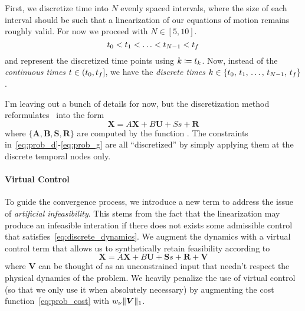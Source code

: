 \documentclass[10pt]{article}
\begin{document}

First, we discretize time into $N$ evenly spaced intervals, where the size of each interval should be such that a linearization of our equations of motion remains roughly valid. For now we proceed with $N\in[5,10]$. 
\begin{equation}
t_0 < t_1 < \ldots < t_{N-1} < t_f
\end{equation}
and represent the discretized time points using $k \coloneqq t_k$. Now, instead of the \textit{continuous times} $t\in(t_0,t_f]$, we have the \textit{discrete times} $k\in\{t_0,\,t_1,\,\ldots,\,t_{N-1},\,t_f\}$.

I'm leaving out a bunch of details for now, but the discretization method reformulates~ into the form
\begin{equation}
\bm{X} = A \bm{X} + B \bm{U} + S s + \bm{R}
\label{eq:discrete_dynamics}
\end{equation}
where $\{\bm{A},\bm{B},\bm{S},\bm{R}\}$ are computed by the function . The constraints in~\eqref{eq:prob_d}-\eqref{eq:prob_g} are all ``discretized'' by simply applying them at the discrete temporal nodes only. 

\paragraph{Virtual Control}

To guide the convergence process, we introduce a new term to address the issue of \textit{artificial infeasibility}. This stems from the fact that the linearization may produce an infeasible interation if there does not exists some admissible control that satisfies~\eqref{eq:discrete_dynamics}. We augment the dynamics with a virtual control term that allows us to synthetically retain feasibility according to
\begin{equation}
\bm{X} = A \bm{X} + B \bm{U} + \bm{S} s + \bm{R} + \bm{V}
\label{eq:VC_discrete_dynamics}
\end{equation}
where $\bm{V}$ can be thought of as an unconstrained input that needn't respect the physical dynamics of the problem. We heavily penalize the use of virtual control (so that we only use it when absolutely necessary) by augmenting the cost function~\eqref{eq:prob_cost} with $w_{\nu} \| \bm{V} \|_1$.
\end{document}
